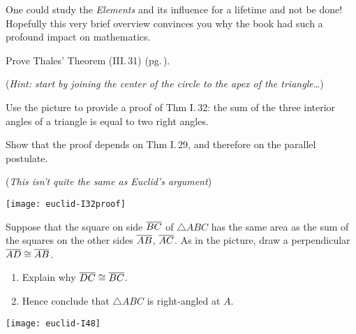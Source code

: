 One could study the \emph{Elements} and its influence for a lifetime and not be done! Hopefully this very brief overview convinces you why the book had such a profound impact on mathematics.


\begin{exercises}
	\exstart Prove Thales' Theorem (III.\,31) (pg.\,\pageref{pg:thalesthm}).\vspace{-5pt}
	
	\begin{enumerate}\setcounter{enumi}{1}
	  \item[](\emph{Hint: start by joining the center of the circle to the apex of the triangle\ldots})
	  
	  \begin{minipage}[t]{0.7\linewidth}\vspace{0pt}
		  \item%
		  Use the picture to provide a proof of Thm I.\,32: the sum of the three interior angles of a triangle is equal to two right angles.\par
		  Show that the proof depends on Thm I.\,29, and therefore on the parallel postulate.\par
		  (\emph{This isn't quite the same as Euclid's argument})
	  \end{minipage}
	  \hfill
	  \begin{minipage}[t]{0.29\linewidth}\vspace{0pt}
	  	\flushright
	  	\texttt{[image: euclid-I32proof]}
	  \end{minipage}
	  
	  \begin{minipage}[t]{0.7\linewidth}\vspace{0pt}
		  \item\label{exs:pythagconv} Suppose that the square on side $\overline{BC}$ of $\triangle ABC$ has the same area as the sum of the squares on the other sides $\overline{AB}$, $\overline{AC}$. As in the picture, draw a perpendicular $\overline{AD}\cong \overline{AB}$.
		  \begin{enumerate}
		    \item Explain why $\overline{DC}\cong\overline{BC}$.
		    \item Hence conclude that $\triangle ABC$ is right-angled at $A$.
		  \end{enumerate}
	  \end{minipage}
	  \hfill
	  \begin{minipage}[t]{0.29\linewidth}\vspace{0pt}
	  	\flushright
	  	\texttt{[image: euclid-I48]}
	  \end{minipage}
	

\end{enumerate}
\end{exercises}
